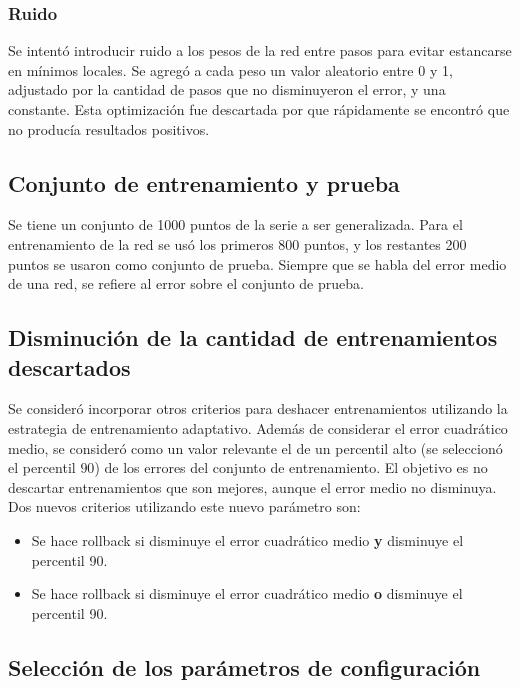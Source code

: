 \documentclass[a4paper,10pt]{article}
\begin{document}
        \subsubsection{Ruido}

        Se intentó introducir ruido a los pesos de la red entre pasos para evitar estancarse en mínimos locales.
        Se agregó a cada peso un valor aleatorio entre 0 y 1, adjustado por la cantidad de pasos que no disminuyeron el error, y una constante.
        Esta optimización fue descartada por que rápidamente se encontró que no producía resultados positivos.

    \subsection{Conjunto de entrenamiento y prueba}

    Se tiene un conjunto de 1000 puntos de la serie a ser generalizada.
    Para el entrenamiento de la red se usó los primeros 800 puntos, y los restantes 200 puntos se usaron como conjunto de prueba.
    Siempre que se habla del error medio de una red, se refiere al error sobre el conjunto de prueba.

    \subsection{Disminución de la cantidad de entrenamientos descartados}
        \label{less_rollbacks}
        Se consideró incorporar otros criterios para deshacer entrenamientos utilizando la estrategia de entrenamiento adaptativo. Además de considerar el error cuadrático medio, 
        se consideró como un valor relevante el de un percentil alto (se seleccionó el percentil $90$) de los errores del conjunto de entrenamiento. El objetivo es no descartar 
        entrenamientos que son mejores, aunque el error medio no disminuya. Dos nuevos criterios utilizando este nuevo parámetro son:

        \begin{itemize}
            \item Se hace rollback si disminuye el error cuadrático medio \textbf{y} disminuye el percentil 90.
            \item Se hace rollback si disminuye el error cuadrático medio \textbf{o} disminuye el percentil 90.
        \end{itemize}

    \subsection{Selección de los parámetros de configuración}
\end{document}
